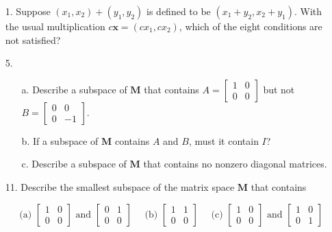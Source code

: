 \documentclass[main.tex]{subfiles}
\begin{document}
\begin{enumerate}
    \item [1.] Suppose $\left(x_{1}, x_{2}\right)+\left(y_{1}, y_{2}\right)$ is defined to be $\left(x_{1}+y_{2}, x_{2}+y_{1}\right)$. With the usual multiplication $c \bm{x}=\left(c x_{1}, c x_{2}\right)$, which of the eight conditions are not satisfied?
    
    \item [5.] 
    \begin{enumerate}
        \item [a.] Describe a subspace of $\mathbf{M}$ that contains $A=\left[\begin{array}{ll}1 & 0 \\ 0 & 0\end{array}\right]$ but not $B=\left[\begin{array}{ll}0 & 0 \\ 0 & -1\end{array}\right]$.
        \item [b.] If a subspace of $\mathbf{M}$ contains $A$ and $B$, must it contain $I$?
        \item [c.] Describe a subspace of $\mathbf{M}$ that contains no nonzero diagonal matrices.
    \end{enumerate}
    
    \item [11.] Describe the smallest subspace of the matrix space $\mathbf{M}$ that contains
    
    $$
    \text{ (a) } \left[\begin{array}{ll}1 & 0 \\ 0 & 0\end{array}\right] \text{ and } \left[\begin{array}{ll}0 & 1 \\ 0 & 0\end{array}\right] \quad
    \text{ (b) } \left[\begin{array}{ll}1 & 1 \\ 0 & 0\end{array}\right] \quad
    \text{ (c) } \left[\begin{array}{ll}1 & 0 \\ 0 & 0\end{array}\right] \text{ and } \left[\begin{array}{ll}1 & 0 \\ 0 & 1\end{array}\right]
    $$
    

\end{enumerate}
\end{document}
